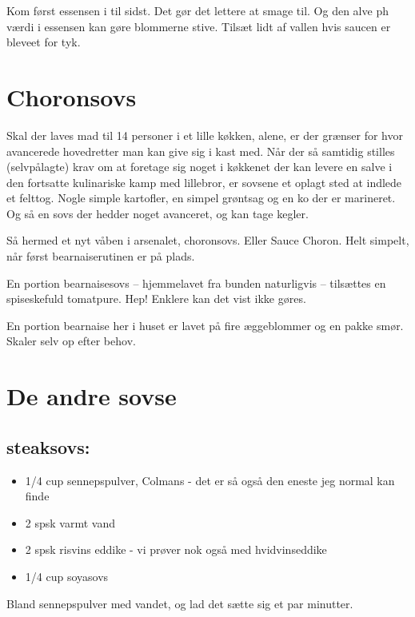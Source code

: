 \documentclass[
]{book}
\providecommand{\tightlist}{%
  \setlength{\itemsep}{0pt}\setlength{\parskip}{0pt}}
\begin{document}
Kom først essensen i til sidst. Det gør det lettere at smage til. Og
den alve ph værdi i essensen kan gøre blommerne stive. Tilsæt lidt af vallen
hvis saucen er bleveet for tyk.

\hypertarget{choronsovs}{%
\section{Choronsovs}\label{choronsovs}}

Skal der laves mad til 14 personer i et lille køkken, alene, er der grænser for hvor avancerede hovedretter man kan give sig i kast med. Når der så samtidig stilles (selvpålagte) krav om at foretage sig noget i køkkenet der kan levere en salve i den fortsatte kulinariske kamp med lillebror, er sovsene et oplagt sted at indlede et felttog. Nogle simple kartofler, en simpel grøntsag og en ko der er marineret. Og så en sovs der hedder noget avanceret, og kan tage kegler.~

Så hermed et nyt våben i arsenalet, choronsovs. Eller Sauce Choron. Helt simpelt, når først bearnaiserutinen er på plads.

En portion bearnaisesovs -- hjemmelavet fra bunden naturligvis -- tilsættes en spiseskefuld tomatpure. Hep! Enklere kan det vist ikke gøres.~

En portion bearnaise her i huset er lavet på fire æggeblommer og en pakke smør. Skaler selv op efter behov.

\hypertarget{de-andre-sovse}{%
\section{De andre sovse}\label{de-andre-sovse}}

\hypertarget{steaksovs}{%
\subsection{steaksovs:}\label{steaksovs}}

\begin{itemize}
\tightlist
\item
  1/4 cup sennepspulver, Colmans - det er så også den eneste jeg normal kan finde
\item
  2 spsk varmt vand
\item
  2 spsk risvins eddike - vi prøver nok også med hvidvinseddike
\item
  1/4 cup soyasovs
\end{itemize}

Bland sennepspulver med vandet, og lad det sætte sig et par minutter.
\end{document}

